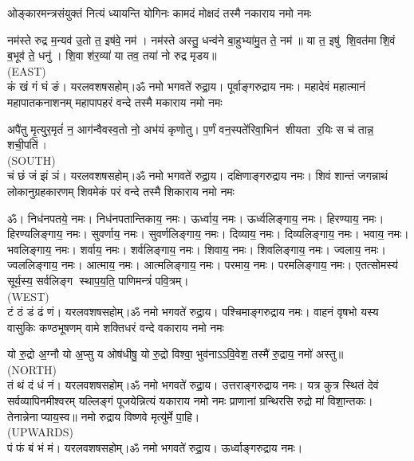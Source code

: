 


\twolineshloka
{ओङ्कारमन्त्रसंयुक्तं नित्यं ध्यायन्ति योगिनः}
{कामदं मोक्षदं तस्मै नकाराय नमो नमः}

नम॑स्ते रुद्र म॒न्यव॑ उ॒तो त॒ इष॑वे॒ नम॑। नम॑स्ते अस्तु॒ धन्व॑ने बा॒हुभ्या॑मु॒त ते॒ नम॑॥ या त॒ इषु॑ शि॒वत॑मा शि॒वं ब॒भूव॑ ते॒ धनु॑। शि॒वा श॑र॒व्या॑ या तव॒ तया॑ नो रुद्र मृडय॥\\
{\scriptsize (EAST)}\\
कं खं गं घं ङं। यरलवशषसहोम्।ॐ नमो भगवते॑ रुद्रा॒य। पूर्वाङ्गरुद्राय नमः। 
\medskip
\twolineshloka
{महादेवं महात्मानं महापातकनाशनम्}
{महापापहरं वन्दे तस्मै मकाराय नमो नमः}

अपै॑तु मृ॒त्युर॒मृतं॑ न॒ आग॑न्वैवस्व॒तो नो॒ अभ॑यं कृणोतु।
प॒र्णं वन॒स्पते॑रिवा॒भिन॑ शीयता र॒यिः स च॑ तान्न॒ शची॒पति॑।\\
{\scriptsize (SOUTH)}\\
चं छं जं झं ञं। यरलवशषसहोम्।ॐ नमो भगवते॑ रुद्रा॒य। दक्षिणाङ्गरुद्राय नमः।
\medskip
\twolineshloka
{शिवं शान्तं जगन्नाथं लोकानुग्रहकारणम्}
{शिवमेकं परं वन्दे तस्मै शिकाराय नमो नमः}

ॐ। निध॑नपतये॒ नमः। निध॑नपतान्तिकाय॒ नमः। ऊर्ध्वाय॒ नमः। ऊर्ध्वलिङ्गाय॒ नमः। हिरण्याय॒ नमः। हिरण्यलिङ्गाय॒ नमः। सुवर्णाय॒ नमः। सुवर्णलिङ्गाय॒ नमः। दिव्याय॒ नमः। दिव्यलिङ्गाय॒ नमः। भवाय॒ नमः। भवलिङ्गाय॒ नमः। शर्वाय॒ नमः। शर्वलिङ्गाय॒ नमः। शिवाय॒ नमः। शिवलिङ्गाय॒ नमः। ज्वलाय॒ नमः। ज्वललिङ्गाय॒ नमः। आत्माय॒ नमः। आत्मलिङ्गाय॒ नमः। परमाय॒ नमः। परमलिङ्गाय॒ नमः। एतत्सोमस्य॑ सूर्य॒स्य॒ सर्वलिङ्ग स्थाप॒य॒ति॒ पाणिमन्त्रं॑ पवि॒त्रम्।\\
{\scriptsize (WEST)}\\
टं ठं डं ढं णं। यरलवशषसहोम्।ॐ नमो भगवते॑ रुद्रा॒य। पश्चिमाङ्गरुद्राय नमः।
\medskip
\twolineshloka
{वाहनं वृषभो यस्य वासुकिः कण्ठभूषणम्}
{वामे शक्तिधरं वन्दे वकाराय नमो नमः}

यो रु॒द्रो अ॒ग्नौ यो अ॒प्सु य ओष॑धीषु॒ यो रु॒द्रो विश्वा॒ भुव॑नाऽऽवि॒वेश॒ तस्मै॑ रु॒द्राय॒ नमो॑ अस्तु॥ \\
{\scriptsize (NORTH)}\\
तं थं दं धं नं। यरलवशषसहोम्।ॐ नमो भगवते॑ रुद्रा॒य। उत्तराङ्गरुद्राय नमः।
\medskip
\twolineshloka
{यत्र कुत्र स्थितं देवं सर्वव्यापिनमीश्वरम्}
{यल्लिङ्गं पूजयेन्नित्यं यकाराय नमो नमः}
प्राणानां ग्रन्थिरसि रुद्रो मा॑ विशा॒न्तकः। तेनान्नेनाप्याय॒स्व॥ नमो रुद्राय विष्णवे मृत्यु॑र्मे पा॒हि।\\
{\scriptsize (UPWARDS)}\\
पं फं बं भं मं। यरलवशषसहोम्।ॐ नमो भगवते॑ रुद्रा॒य। ऊर्ध्वाङ्गरुद्राय नमः।

